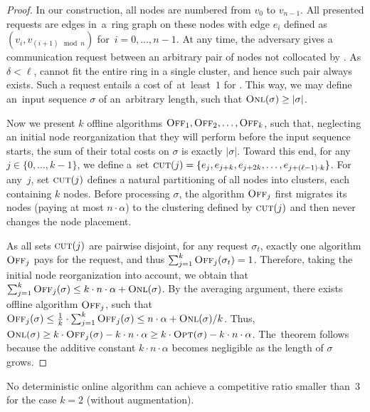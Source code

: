 \begin{proof}
In our construction, all nodes are numbered from $v_0$ to $v_{n-1}$. All
presented requests are edges in~a~ring graph on these nodes with edge $e_i$
defined as $(v_i,v_{(i+1) \mod n })$ for~$i = 0, \ldots, n-1$. At any time,
the adversary gives a communication request between an arbitrary pair of nodes
not collocated by \ONL. As $\delta < \ell$, \ONL cannot fit the entire ring in
a single cluster, and hence such pair always exists. Such a request
entails a cost of~at~least~$1$ for \ONL. This way, we may define an~input
sequence $\sigma$ of an~arbitrary length, such that $\textsc{Onl}(\sigma) \geq
|\sigma|$.

Now we present $k$ offline algorithms $\textsc{Off}_1, \textsc{Off}_2, \ldots, \textsc{Off}_k$, such
that, neglecting an initial node reorganization that they will perform before
the input sequence starts, the sum of their total costs on $\sigma$ is exactly
$|\sigma|$. Toward this end, for any $j \in \{0,\ldots,k-1\}$, we define a~set $\textsc{cut}(j) = \{ e_j, e_{j+k}, e_{j+2k},
\ldots, e_{j+(\ell-1)\cdot k} \}$. For any~$j$, set $\textsc{cut}(j)$ defines a
natural partitioning of all nodes into clusters, each containing $k$ nodes.
Before processing $\sigma$, the algorithm $\textsc{Off}_j$ first migrates its nodes
(paying at most $n \cdot \alpha$) to the clustering defined by $\textsc{cut}(j)$ and
then never changes the node placement.

As all sets $\textsc{cut}(j)$ are pairwise disjoint, for any request $\sigma_t$,
exactly one algorithm $\textsc{Off}_j$ pays for the request, and thus $\sum_{j=1}^k
\textsc{Off}_j(\sigma_t) = 1$. Therefore, taking the initial node reorganization into
account, we obtain that $\sum_{j=1}^k \textsc{Off}_j(\sigma) \leq k \cdot n \cdot
\alpha + \textsc{Onl}(\sigma)$. By the averaging argument, there exists offline
algorithm $\textsc{Off}_j$, such that $\textsc{Off}_j(\sigma) \leq \frac{1}{k} \cdot
\sum_{j=1}^k \textsc{Off}_j(\sigma) \leq n \cdot \alpha + \textsc{Onl}(\sigma) / k$.
Thus, $\textsc{Onl}(\sigma) \geq k \cdot \textsc{Off}_j(\sigma) - k \cdot n \cdot
\alpha \geq k \cdot \textsc{Opt}(\sigma) - k \cdot n \cdot \alpha$.
The~theorem follows because the additive constant $k \cdot n \cdot \alpha$
becomes negligible as the length of $\sigma$ grows.
\end{proof}


\begin{theorem}
No deterministic online algorithm \ONL can achieve a competitive ratio 
smaller than~$3$ for the case $k = 2$ (without augmentation).
\end{theorem}

